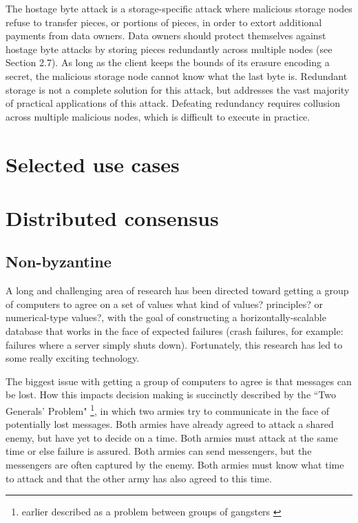 \documentclass[11pt,fleqn,openany]{book}
\newcommand{\bs}[1]{{\color{red}#1}}
\begin{document}
The hostage byte attack is a storage-specific attack where malicious storage
nodes
refuse to transfer pieces, or portions of pieces, in order to extort additional
payments from data owners. Data owners should protect themselves against hostage
byte attacks by storing pieces redundantly across multiple nodes (see Section
2.7). As long as the client keeps the bounds of its erasure encoding a secret,
the malicious storage node cannot know what the last byte is. Redundant storage
is not
a complete solution for this attack, but addresses the vast majority of
practical applications of this attack. Defeating redundancy requires collusion
across multiple malicious nodes, which is difficult to execute in practice.

\chapter{Selected use cases}





\chapter{Distributed consensus}

\section{Non-byzantine}

A long and challenging area of research has been directed toward getting a
group of computers to agree on a set of values
\bs{what kind of values? principles? or numerical-type values?},
with the goal of constructing a
horizontally-scalable database that works in the face of expected failures
(crash failures, for example: failures where a server simply shuts down).
Fortunately, this research has led to some really exciting technology.

The biggest issue with getting a group of computers to agree is that messages
can be lost. How this impacts decision making is succinctly described by the
``Two Generals' Problem" \cite{two-generals}
\footnote{earlier described as a problem
between groups of gangsters \cite{two-gangsters}}, in which two armies try to
communicate in the face of potentially lost messages. Both armies have already
agreed to attack a shared enemy, but have yet to decide on a time. Both armies
must attack at the same time or else failure is assured. Both armies can send
messengers, but the messengers are often captured by the enemy. Both armies must
know what time to attack and that the other army has also agreed to this time.
\end{document}
